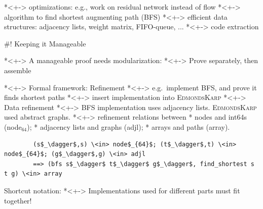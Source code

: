 \documentclass[fleqn]{beamer}
\newcommand{\high}[1]{{\color{blue}#1}}
\begin{document}
  *<+-> optimizations: e.g., work on residual network instead of flow
  *<+-> algorithm to find shortest augmenting path (BFS)
  *<+-> efficient data structures: adjacency lists, weight matrix, FIFO-queue, ...
  *<+-> code extraction

#! Keeping it Manageable

  *<+-> A manageable proof needs modularization:
    *<+-> Prove separately, then assemble

  *<+-> Formal framework: Refinement
    *<+-> e.g.\ implement BFS, and prove it finds shortest paths
    *<+-> insert implementation into \textsc{EdmondsKarp}
  *<+-> Data refinement
    *<+-> BFS implementation uses adjacency lists. \textsc{EdmondsKarp} used abstract graphs.
    *<+-> refinement relations between
        * nodes and int64s (\high{node$_{64}$});
        * adjacency lists and graphs (\high{adjl});
        * arrays and paths (\high{array}).
      \onslide<+->
      \begin{lstlisting}
        (s$_\dagger$,s) \<in> node$_{64}$; (t$_\dagger$,t) \<in> node$_{64}$; (g$_\dagger$,g) \<in> adjl
        ==> (bfs s$_\dagger$ t$_\dagger$ g$_\dagger$, find_shortest s t g) \<in> array
      \end{lstlisting}

      \onslide<+->
      Shortcut notation: 
  *<+-> Implementations used for different parts must fit together!
\end{document}
